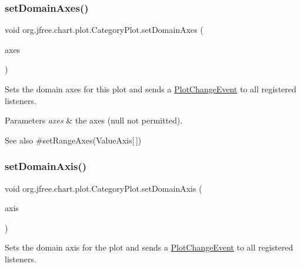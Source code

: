 \subsubsection{\texorpdfstring{set\+Domain\+Axes()}{setDomainAxes()}}
{\footnotesize\ttfamily void org.\+jfree.\+chart.\+plot.\+Category\+Plot.\+set\+Domain\+Axes (\begin{DoxyParamCaption}\item[{\mbox{\hyperlink{classorg_1_1jfree_1_1chart_1_1axis_1_1_category_axis}{Category\+Axis}} \mbox{[}$\,$\mbox{]}}]{axes }\end{DoxyParamCaption})}

Sets the domain axes for this plot and sends a \mbox{\hyperlink{}{Plot\+Change\+Event}} to all registered listeners.


\begin{DoxyParams}{Parameters}
{\em axes} & the axes ({\ttfamily null} not permitted).\\
\hline
\end{DoxyParams}
\begin{DoxySeeAlso}{See also}
\#set\+Range\+Axes(\+Value\+Axis\mbox{[}$\,$\mbox{]}) 
\end{DoxySeeAlso}
\mbox{\label{classorg_1_1jfree_1_1chart_1_1plot_1_1_category_plot_a2d2f1627184e7686e9a74be1f87237f8}} 
\subsubsection{\texorpdfstring{set\+Domain\+Axis()}{setDomainAxis()}\hspace{0.1cm}{\footnotesize\ttfamily [1/3]}}
{\footnotesize\ttfamily void org.\+jfree.\+chart.\+plot.\+Category\+Plot.\+set\+Domain\+Axis (\begin{DoxyParamCaption}\item[{\mbox{\hyperlink{classorg_1_1jfree_1_1chart_1_1axis_1_1_category_axis}{Category\+Axis}}}]{axis }\end{DoxyParamCaption})}

Sets the domain axis for the plot and sends a \mbox{\hyperlink{}{Plot\+Change\+Event}} to all registered listeners.


